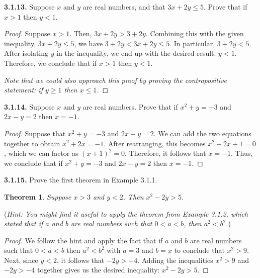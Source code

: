 \documentclass[12pt]{amsart}
\newenvironment{statement}[1]{\smallskip\noindent\color[rgb]{.6627, .3529, .6314} {\bf #1.}}{}
\newtheorem{theorem}{Theorem}
\theoremstyle{definition}
\theoremstyle{remark}
\begin{document}
\begin{statement}{3.1.13}
Suppose $x$ and $y$ are real numbers, and that $3x + 2y \leq 5$.
Prove that if $x > 1$ then $y < 1$.
\end{statement}

\begin{proof}
Suppose $x > 1$.
Then, $3x + 2y > 3 + 2y$.
Combining this with the given inequality, $3x + 2y \leq 5$, we have $3 + 2y < 3x + 2y \leq 5$.
In particular, $3 + 2y < 5$.
After isolating $y$ in the inequality, we end up with the desired result: $y < 1$.
Therefore, we conclude that if $x > 1$ then $y < 1$.

\emph{Note that we could also approach this proof by proving the contrapositive statement: if $y \geq 1$ then $x \leq 1$.}
\end{proof}


\begin{statement}{3.1.14}
Suppose $x$ and $y$ are real numbers.
Prove that if $x^2 + y = -3$ and $2x - y = 2$ then $x = -1$.
\end{statement}

\begin{proof}
Suppose that $x^2 + y = -3$ and $2x - y = 2$.
We can add the two equations together to obtain $x^2 + 2x = -1$.
After rearranging, this becomes $x^2 + 2x + 1 = 0$, which we can factor as $(x + 1)^2 = 0$.
Therefore, it follows that $x = -1$.
Thus, we conclude that if $x^2 + y = -3$ and $2x - y = 2$ then $x = -1$.
\end{proof}

\begin{statement}{3.1.15}
Prove the first theorem in Example 3.1.1.
\begin{theorem}
	Suppose $x > 3$ and $y < 2$.
	Then $x^2 - 2y > 5$.
\end{theorem}
(\emph{Hint: You might find it useful to apply the theorem from Example 3.1.2,
which stated that if $a$ and $b$ are real numbers such that $0 < a < b$, then $a^2 < b^2$.})
\end{statement}

\begin{proof}
We follow the hint and apply the fact that if $a$ and $b$ are real numbers such that
$0 < a < b$ then $a^2 < b^2$ with $a = 3$ and $b = x$ to conclude that $x^2 > 9$.
Next, since $y < 2$, it follows that $-2y > -4$.
Adding the inequalities $x^2 > 9$ and $-2y > -4$ together gives us the desired inequality:
$x^2 - 2y > 5$.
\end{proof}
\end{document}
